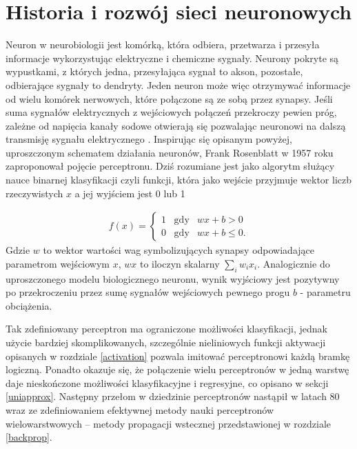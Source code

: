 \documentclass[11pt]{book}
\theoremstyle{definition}
\begin{document}
\section{Historia i rozwój sieci neuronowych}

Neuron w neurobiologii jest komórką, która odbiera, przetwarza i przesyła informacje wykorzystując elektryczne i chemiczne sygnały. Neurony pokryte są wypustkami, z których jedna, przesyłająca sygnał to akson, pozostałe, odbierające sygnały to dendryty.  Jeden neuron może więc otrzymywać informacje od wielu komórek nerwowych, które połączone są ze sobą przez synapsy. Jeśli suma sygnałów elektrycznych z wejściowych połączeń przekroczy pewien próg, zależne od napięcia kanały sodowe otwierają się pozwalając neuronowi na dalszą transmisję sygnału elektrycznego \cite{NeuronyDelta}. Inspirując się opisanym powyżej, uproszczonym schematem działania neuronów, Frank Rosenblatt w 1957 roku zaproponował pojęcie perceptronu. Dziś rozumiane jest jako algorytm służący nauce binarnej klasyfikacji czyli funkcji, która jako wejście przyjmuje wektor liczb rzeczywistych $x$ a jej wyjściem jest 0 lub 1

\begin{eqnarray*}
	f(x) = \begin{cases} 1 \;\;\;\text{gdy} & wx + b > 0 \\ 0 \;\;\;\text{gdy} &wx + b \leq 0.  \end{cases}
\end{eqnarray*}
Gdzie $w$ to wektor wartości wag symbolizujących synapsy odpowiadające parametrom wejściowym $x$, $wx$ to iloczyn skalarny $\sum_{i}w_i x_i$. Analogicznie do uproszczonego modelu biologicznego neuronu, wynik wyjściowy jest pozytywny po przekroczeniu przez sumę sygnałów wejściowych pewnego progu $b$ - parametru obciążenia. 

Tak zdefiniowany perceptron ma ograniczone możliwości klasyfikacji, jednak użycie bardziej skomplikowanych, szczególnie nieliniowych funkcji aktywacji opisanych w rozdziale \ref{activation} pozwala imitować perceptronowi każdą bramkę logiczną. Ponadto okazuje się, że połączenie wielu perceptronów w jedną warstwę daje nieskończone możliwości klasyfikacyjne i regresyjne, co opisano w sekcji \ref{uniapprox}. Następny przełom w dziedzinie perceptronów nastąpił  w latach 80 wraz ze zdefiniowaniem efektywnej metody nauki perceptronów wielowarstwowych -- metody propagacji wstecznej przedstawionej w rozdziale \ref{backprop}. 
\end{document}
